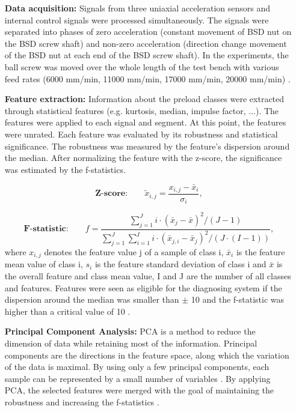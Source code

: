 \begin{itemize}
    \item [\textbf{Data acquisition:}] Signals from three uniaxial acceleration sensors and internal control signals were processed simultaneously. The signals were separated into phases of zero acceleration (constant movement of BSD nut on the BSD screw shaft) and non-zero acceleration (direction change movement of the BSD nut at each end of the BSD screw shaft). In the experiments, the ball screw was moved over the whole length of the test bench with various feed rates (6000 mm/min, 11000 mm/min, 17000 mm/min, 20000 mm/min) \cite{Denkena2021}.
    \item [\textbf{Feature extraction:}] Information about the preload classes were extracted through statistical features (e.g. kurtosis, median, impulse factor, ...). The features were applied to each signal and segment. At this point, the features were unrated. Each feature was evaluated by its robustness and statistical significance. The robustness was measured by the feature's dispersion around the median. After normalizing the feature with the z-score, the significance was estimated by the f-statistics.
    
    \begin{equation}
        \textbf{Z-score:}\qquad \tilde{x}_{i,j} = \frac{x_{i,j} - \bar x_{i}}{\sigma_{i}},
    \end{equation}
    
    \begin{equation}
        \textbf{F-statistic:}\qquad f = \frac{\sum_{j=1}^{J} i \cdot (\bar x_{j} -\bar x)^{2}/(J-1)}{\sum_{j=1}^{J} \sum_{i=1}^{I} i \cdot (\bar x_{j,i} -\bar x_{j})^{2}/(J \cdot (I-1))},
    \end{equation}
    where ${x}_{i,j}$ denotes the feature value j of a sample of class i, $\bar{x}_{i}$ is the feature mean value of class i, ${s}_{i}$ is the feature standard deviation of class i and $\bar{x}$ is the overall feature and class mean value, I and J are the number of all classes and features. Features were seen as eligible for the diagnosing system if the dispersion around the median was smaller than $\pm$ 10 and the f-statistic was higher than a critical value of 10 \cite{Denkena2021}. 
    
    \item [\textbf{Principal Component Analysis:}] 
    PCA is a method to reduce the dimension of data while retaining most of the information. Principal components are the directions in the feature space, along which the variation of the data is maximal. By using only a few principal components, each sample can be represented by a small number of variables \cite{Ringner2008}. By applying PCA, the selected features were merged with the goal of maintaining the robustness and increasing the f-statistics \cite{Denkena2021}.
    

\end{itemize}
